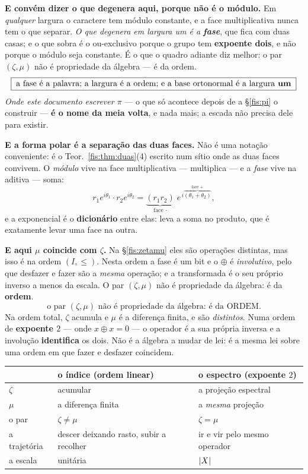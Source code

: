 \documentclass[livro.tex]{subfiles}
\begin{document}
\medskip\noindent\textbf{E convém dizer o que degenera aqui, porque não é o
módulo.} Em \emph{qualquer} largura o caractere tem módulo constante, e a face
multiplicativa nunca tem o que separar. \emph{O que degenera em largura um é a
\textbf{fase}}, que fica com duas casas; e o que sobra é o ou-exclusivo porque o
grupo tem \textbf{expoente dois}, e não porque o módulo seja constante. É o que
o quadro adiante diz melhor: o par $(\zeta,\mu)$ não é propriedade da álgebra ---
é da ordem.
\[
\boxed{\;\text{a fase é a palavra; a largura é a ordem; e a base ortonormal é a largura \textbf{um}}\;}
\]
\emph{Onde este documento escrever $\pi$} --- o que só acontece depois de a
§\ref{fis:pi} o construir --- \textbf{é o nome da meia volta}, e nada mais; a
escada não precisa dele para existir.

\medskip\noindent\textbf{E a forma polar é a separação das duas faces.} Não é uma
notação conveniente: é o Teor.~\ref{fis:thm:duas}(4) escrito num sítio onde as
duas faces convivem. O \emph{módulo} vive na face multiplicativa --- multiplica
--- e a \emph{fase} vive na aditiva --- soma:
\[
r_{1}e^{i\theta_{1}}\cdot r_{2}e^{i\theta_{2}}
=\underbrace{(r_{1}r_{2})}_{\text{face }\cdot}\;
 e^{\,i\overbrace{(\theta_{1}+\theta_{2})}^{\text{face }+}} ,
\]
e a exponencial é o \textbf{dicionário} entre elas: leva a soma no produto, que é
exatamente levar uma face na outra.

\medskip\noindent\textbf{E aqui $\mu$ coincide com $\zeta$.} Na §\ref{fis:zetamu}
eles são operações distintas, mas isso é na ordem $(I,\le)$. Nesta ordem a fase é
um bit e o $\oplus$ é \emph{involutivo}, pelo que desfazer e fazer são a
\emph{mesma} operação; e a transformada é o seu próprio inverso a menos da
escala. O par $(\zeta,\mu)$ não é propriedade da álgebra: é da \textbf{ordem}.
\[
\boxed{\;\text{o par }(\zeta,\mu)\text{ não é propriedade da álgebra: é da ORDEM.}\;}
\]
Na ordem total, $\zeta$ acumula e $\mu$ é a diferença finita, e são
\emph{distintos}. Numa ordem de \textbf{expoente $2$} --- onde $x\oplus x=0$ ---
o operador é a sua própria inversa e a involução \textbf{identifica} os dois.
Não é a álgebra a mudar de lei: é a mesma lei sobre uma ordem em que fazer e
desfazer coincidem.

\begin{center}\small
\begin{tabular}{@{}lll@{}}
\toprule
 & \textbf{o índice} (ordem linear) & \textbf{o espectro} (expoente $2$)\\
\midrule
$\zeta$ & acumular & a projeção espectral\\
$\mu$ & a diferença finita & a \emph{mesma} projeção\\
o par & $\zeta\neq\mu$ & $\boxed{\zeta=\mu}$\\
a trajetória & descer deixando rasto, subir a recolher & ir e vir pelo mesmo operador\\
a escala & unitária & $\lvert X\rvert$\\
\bottomrule
\end{tabular}
\end{center}
\end{document}
